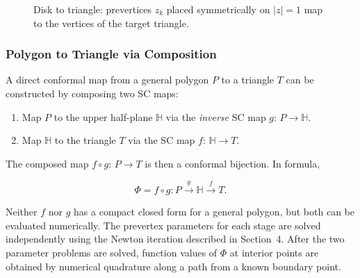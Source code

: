 \documentclass[12pt,a4paper]{article}
\begin{document}
\begin{figure}[H]
\centering
{}
\caption{Disk to triangle: prevertices \(z_k\) placed symmetrically on \(|z|=1\) map to the vertices of the target triangle.}
\end{figure}

\subsubsection{Polygon to Triangle via Composition}

A direct conformal map from a general polygon \(P\) to a triangle \(T\) can be constructed by composing two SC maps:
\begin{enumerate}
  \item Map \(P\) to the upper half-plane \(\mathbb{H}\) via the \emph{inverse} SC map \(g:\,P\to\mathbb{H}\).
  \item Map \(\mathbb{H}\) to the triangle \(T\) via the SC map \(f:\,\mathbb{H}\to T\).
\end{enumerate}
The composed map \(f\circ g:\,P\to T\) is then a conformal bijection. In formula,
\begin{formulabox}
\[
\Phi = f\circ g : P \xrightarrow{\;g\;} \mathbb{H} \xrightarrow{\;f\;} T.
\]
\end{formulabox}
Neither \(f\) nor \(g\) has a compact closed form for a general polygon, but both can be evaluated numerically. The prevertex parameters for each stage are solved independently using the Newton iteration described in Section~4. After the two parameter problems are solved, function values of \(\Phi\) at interior points are obtained by numerical quadrature along a path from a known boundary point.
\end{document}
